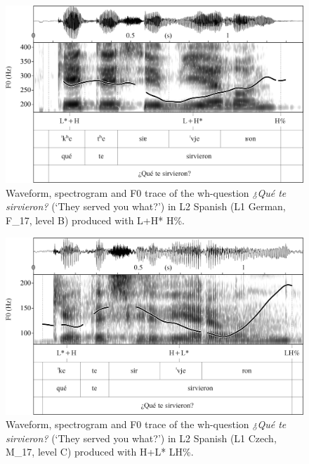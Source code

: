 \begin{figure}


\includegraphics[width=\textwidth]{figures/Figure_4.123.png}



\caption{Waveform, spectrogram and F0 trace of the wh-question \textit{¿Qué te sirvieron?} (‘They served you what?’) in L2 Spanish (L1 German, F\_17, level B) produced with L+H* H\%.}
\label{fig:4.123}
\end{figure}

\begin{figure}


\includegraphics[width=\textwidth]{figures/Figure_4.124.png}



\caption{Waveform, spectrogram and F0 trace of the wh-question \textit{¿Qué te sirvieron?} (‘They served you what?’) in L2 Spanish (L1 Czech, M\_17, level C) produced with H+L* LH\%.}
\label{fig:4.124}
\end{figure}

